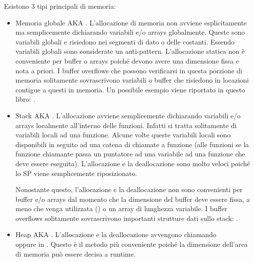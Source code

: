 ﻿

Esistono 3 tipi principali di memoria:

\begin{itemize}
\item
Memoria globale \ac{AKA} .
L'allocazione di memoria non avviene esplicitamente ma semplicemente dichiarando variabili e/o arrays globalmente.
Queste sono variabili globali e risiedono nei segmenti di dato o delle costanti. Essendo variabili globali sono considerate un \gls{anti-pattern}.
L'allocazione statica non è conveniente per buffer o arrays poiché devono avere una dimensione fissa e nota a priori.
I buffer overflows che possono verificarsi in questa porzione di memoria solitamente sovrascrivono variabili o buffer che risiedono in locazioni contigue a questi in memoria.
Un possibile esempio viene riportato in questo libro: .


\item
Stack \ac{AKA} .
L'allocazione avviene semplicemente dichiarando variabili e/o arrays localmente all'interno delle funzioni. Infatti si tratta solitamente di variabili locali ad una funzione.
Alcune volte queste variabili locali sono disponibili in seguito ad una catena di chiamate a funzione (alle funzioni  se la funzione chiamante passa un puntatore ad una variabile ad una funzione  che deve essere eseguita).
L'allocazione e la deallocazione sono molto veloci poiché lo \ac{SP} viene semplicemente riposizionato.


Nonostante questo, l'allocazione e la deallocazione non sono convenienti per buffer e/o arrays dal momento che la dimensione del buffer deve essere fissa, a meno che venga utilizzata  () o un array di lunghezza variabile.
I buffer overflows solitamente sovrascrivono importanti strutture dati sullo stack: .

\item
Heap \ac{AKA} .
L'allocazione e la deallocazione avvengono chiamando \\
 oppure  in \Cpp.
Questo è il metodo più conveniente poiché la dimensione dell'area di memoria può essere decisa a runtime.


\end{itemize}
